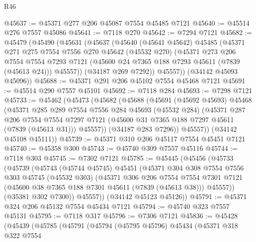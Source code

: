 \begin{lexlean}{R46}
\begin{coremodule}
@45637 := @45371 @277 @206 @45087 @7554 @45485 @7121
@45640 := @45514 @276 @7557 @45086
@45641 := @7118 @270
@45642 := @7294 @7121
@45682 := @45479
    (@45490
      (@45631
        (@45637
          (@45640
            (@45641 @45642)
            @45485
            (@45371
              @271
              @275
              @7554
              @7556
              @270
              @45642
              (@45532 @270)
              (@45371
                @273
                @206
                @7554
                @7554
                @7293
                @7121
                (@45600 @24 @7365 @188 @7293 @45611 (@7839 (@45613 @24)))
                @45557))
            (@34187 @269 @7292))
          @45557))
      (@34142 @45093 @45096))
@45688 := @45371 @291 @206 @45102 @7554 @45468 @7121
@45691 := @45514 @290 @7557 @45101
@45692 := @7118 @284
@45693 := @7298 @7121
@45733 := @45462
    (@45473
      (@45682
        (@45688
          (@45691
            (@45692 @45693)
            @45468
            (@45371
              @285
              @289
              @7554
              @7556
              @284
              @45693
              (@45532 @284)
              (@45371
                @287
                @206
                @7554
                @7554
                @7297
                @7121
                (@45600 @31 @7365 @188 @7297 @45611 (@7839 (@45613 @31)))
                @45557))
            (@34187 @283 @7296))
          @45557))
      (@34142 @45108 @45111))
@45739 := @45371 @310 @206 @45117 @7554 @45451 @7121
@45740 := @45358 @300
@45743 := @45740 @309 @7557 @45116
@45744 := @7118 @303
@45745 := @7302 @7121
@45785 := @45445
    (@45456
      (@45733
        (@45739
          (@45743
            (@45744 @45745)
            @45451
            (@45371
              @304
              @308
              @7554
              @7556
              @303
              @45745
              (@45532 @303)
              (@45371
                @306
                @206
                @7554
                @7554
                @7301
                @7121
                (@45600 @38 @7365 @188 @7301 @45611 (@7839 (@45613 @38)))
                @45557))
            (@35381 @302 @7300))
          @45557))
      (@34142 @45123 @45126))
@45791 := @45371 @324 @206 @45132 @7554 @45434 @7121
@45794 := @45740 @323 @7557 @45131
@45795 := @7118 @317
@45796 := @7306 @7121
@45836 := @45428
    (@45439
      (@45785
        (@45791
          (@45794
            (@45795 @45796)
            @45434
            (@45371
              @318
              @322
              @7554

\end{coremodule}
\end{lexlean}
